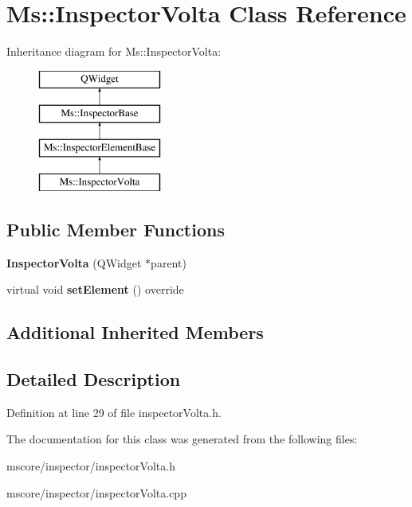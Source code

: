\hypertarget{class_ms_1_1_inspector_volta}{}\section{Ms\+:\+:Inspector\+Volta Class Reference}
\label{class_ms_1_1_inspector_volta}
Inheritance diagram for Ms\+:\+:Inspector\+Volta\+:\begin{figure}[H]
\begin{center}
\leavevmode
\includegraphics[height=4.000000cm]{class_ms_1_1_inspector_volta}
\end{center}
\end{figure}
\subsection*{Public Member Functions}
\begin{DoxyCompactItemize}
\item 
\mbox{\label{class_ms_1_1_inspector_volta_a175b0683b1b0a0f60bb7108637245c3d}} 
{\bfseries Inspector\+Volta} (Q\+Widget $\ast$parent)
\item 
\mbox{\label{class_ms_1_1_inspector_volta_ae3123609e70d3264d030d98e009434d2}} 
virtual void {\bfseries set\+Element} () override
\end{DoxyCompactItemize}
\subsection*{Additional Inherited Members}


\subsection{Detailed Description}


Definition at line 29 of file inspector\+Volta.\+h.



The documentation for this class was generated from the following files\+:\begin{DoxyCompactItemize}
\item 
mscore/inspector/inspector\+Volta.\+h\item 
mscore/inspector/inspector\+Volta.\+cpp\end{DoxyCompactItemize}
